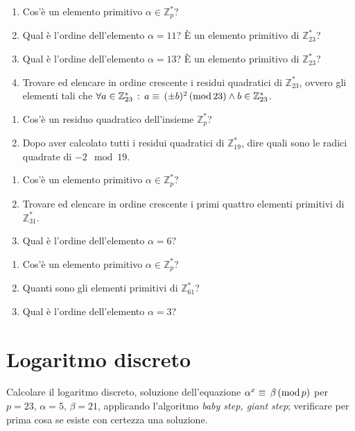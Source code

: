         \begin{enumerate}
            \item Cos'è un elemento primitivo $\alpha \in \mathbb{Z}^{*}_p$?
            \item Qual è l'ordine dell'elemento $\alpha =11$? È un elemento primitivo di $\mathbb{Z}^{*}_{23}$?
            \item Qual è l'ordine dell'elemento $\alpha =13$? È un elemento primitivo di $\mathbb{Z}^{*}_{23}$?
            \item Trovare ed elencare in ordine crescente i residui quadratici di $\mathbb{Z}^{*}_{23}$, ovvero gli 
                elementi tali che $\forall a\in \mathbb{Z}^{*}_{23} \,:\, a\equiv\,(\pm b)^2\,(\mathrm{mod}\,23) \land 
                b\in \mathbb{Z}^{*}_{23}$.
        \end{enumerate}

        \begin{enumerate}
            \item Cos'è un residuo quadratico dell'insieme $\mathbb{Z}^{*}_p$?
            \item Dopo aver calcolato tutti i residui quadratici di $\mathbb{Z}^{*}_{19}$, dire quali sono le radici 
                quadrate di  $-2 \mod 19$.
        \end{enumerate}

        \begin{enumerate}
            \item Cos'è un elemento primitivo $\alpha \in \mathbb{Z}^{*}_p$?
            \item Trovare ed elencare in ordine crescente i primi quattro elementi primitivi di $\mathbb{Z}^{*}_{31}$.
            \item Qual è l'ordine dell'elemento $\alpha =6$?
        \end{enumerate}

        \begin{enumerate}
            \item Cos'è un elemento primitivo $\alpha \in \mathbb{Z}^{*}_p$?
            \item Quanti sono gli elementi primitivi di $\mathbb{Z}^{*}_{61}$?
            \item Qual è l'ordine dell'elemento $\alpha =3$?
        \end{enumerate}

    \bigskip
    \section{Logaritmo discreto}
        Calcolare il logaritmo discreto, soluzione dell'equazione $\alpha^x\equiv\,\beta\,(\mathrm{mod}\,p)$ per 
        $p=23,\, \alpha =5,\, \beta =21$, applicando l'algoritmo \emph{baby step, giant step}; verificare per 
        prima cosa se esiste con certezza una soluzione.

